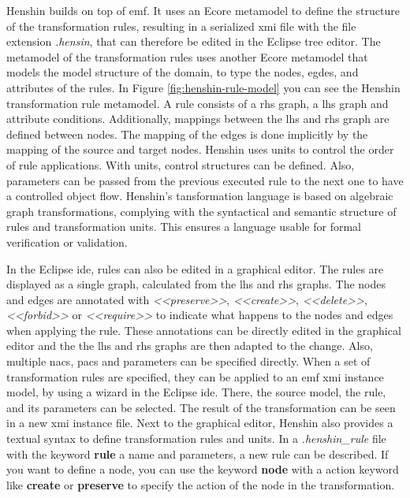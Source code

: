   Henshin builds on top of \ac{emf}. It uses an Ecore metamodel to define the structure of the transformation rules, resulting in a serialized \ac{xmi} file with the file extension \textit{.hensin}, that can therefore be edited in the Eclipse tree editor. \cite{henshin-repo} The metamodel of the transformation rules uses another Ecore metamodel that models the model structure of the domain, to type the nodes, egdes, and attributes of the rules. \cite{henshin} In Figure \ref{fig:henshin-rule-model} you can see the Henshin transformation rule metamodel. A rule consists of a \ac{rhs} graph, a \ac{lhs} graph and attribute conditions. Additionally, mappings between the \ac{lhs} and \ac{rhs} graph are defined between nodes. The mapping of the edges is done implicitly by the mapping of the source and target nodes. \cite{henshin} Henshin uses units to control the order of rule applications. With units, control structures can be defined. Also, parameters can be passed from the previous executed rule to the next one to have a controlled object flow. Henshin's tansformation language is based on algebraic graph transformations, complying with the syntactical and semantic structure of rules and transformation units. This ensures a language usable for formal verification or validation. \cite{henshin}

  In the Eclipse \ac{ide}, rules can also be edited in a graphical editor. The rules are displayed as a single graph, calculated from the \ac{lhs} and \ac{rhs} graphs. The nodes and edges are annotated with \textit{\textless{}\textless{}preserve\textgreater\textgreater}, \textit{\textless{}\textless{}create\textgreater\textgreater}, \textit{\textless{}\textless{}delete\textgreater\textgreater}, \textit{\textless{}\textless{}forbid\textgreater\textgreater} or \textit{\textless{}\textless{}require\textgreater\textgreater} to indicate what happens to the nodes and edges when applying the rule. These annotations can be directly edited in the graphical editor and the the \ac{lhs} and \ac{rhs} graphs are then adapted to the change. Also, multiple \acp{nac}, \acp{pac} and parameters can be specified directly. \cite{henshin-repo} When a set of transformation rules are specified, they can be applied to an \ac{emf} \ac{xmi} instance model, by using a wizard in the Eclipse \ac{ide}. There, the source model, the rule, and its parameters can be selected. The result of the transformation can be seen in a new \ac{xmi} instance file. \cite{henshin-repo} Next to the graphical editor, Henshin also provides a textual syntax to define transformation rules and units. In a \textit{.henshin\_rule} file with the keyword \textbf{rule} a name and parameters, a new rule can be described. If you want to define a node, you can use the keyword \textbf{node} with a action keyword like \textbf{create} or \textbf{preserve} to specify the action of the node in the transformation. 


